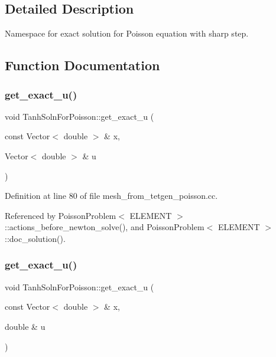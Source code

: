 \subsection{Detailed Description}
Namespace for exact solution for Poisson equation with sharp step. 

\subsection{Function Documentation}
\mbox{\label{namespaceTanhSolnForPoisson_af7896e9c18ce6438c73ae2a875e8b7de}} 
\subsubsection{\texorpdfstring{get\+\_\+exact\+\_\+u()}{get\_exact\_u()}\hspace{0.1cm}{\footnotesize\ttfamily [1/2]}}
{\footnotesize\ttfamily void Tanh\+Soln\+For\+Poisson\+::get\+\_\+exact\+\_\+u (\begin{DoxyParamCaption}\item[{const Vector$<$ double $>$ \&}]{x,  }\item[{Vector$<$ double $>$ \&}]{u }\end{DoxyParamCaption})}



Definition at line 80 of file mesh\+\_\+from\+\_\+tetgen\+\_\+poisson.\+cc.



Referenced by Poisson\+Problem$<$ E\+L\+E\+M\+E\+N\+T $>$\+::actions\+\_\+before\+\_\+newton\+\_\+solve(), and Poisson\+Problem$<$ E\+L\+E\+M\+E\+N\+T $>$\+::doc\+\_\+solution().

\mbox{\label{namespaceTanhSolnForPoisson_af197decab980d38d2037032780723984}} 
\subsubsection{\texorpdfstring{get\+\_\+exact\+\_\+u()}{get\_exact\_u()}\hspace{0.1cm}{\footnotesize\ttfamily [2/2]}}
{\footnotesize\ttfamily void Tanh\+Soln\+For\+Poisson\+::get\+\_\+exact\+\_\+u (\begin{DoxyParamCaption}\item[{const Vector$<$ double $>$ \&}]{x,  }\item[{double \&}]{u }\end{DoxyParamCaption})}




